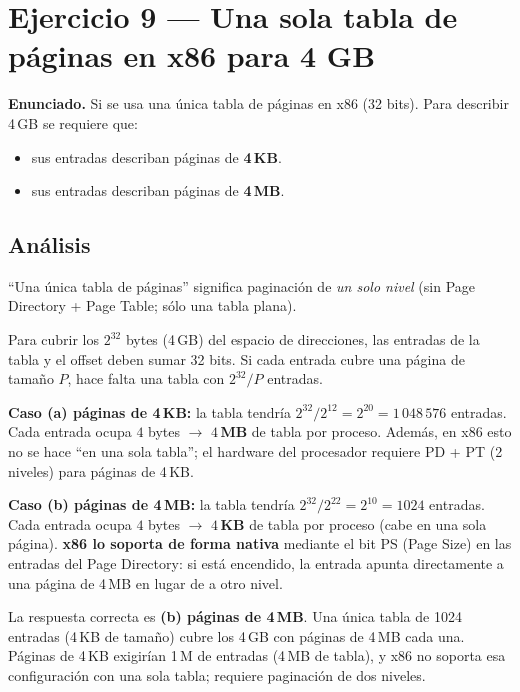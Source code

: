 \documentclass[11pt,a4paper]{article}
\begin{document}
\section{Ejercicio 9 --- Una sola tabla de páginas en x86 para 4 GB}

\textbf{Enunciado.} Si se usa una única tabla de páginas en x86
(32 bits). Para describir 4\,GB se requiere que:

\begin{itemize}[leftmargin=*,nosep]
    \item[(a)] sus entradas describan páginas de \textbf{4\,KB}.
    \item[(b)] sus entradas describan páginas de \textbf{4\,MB}.
\end{itemize}

\subsection*{Análisis}

``Una única tabla de páginas'' significa paginación de \emph{un solo
nivel} (sin Page Directory + Page Table; sólo una tabla plana).

Para cubrir los $2^{32}$ bytes (4\,GB) del espacio de direcciones,
las entradas de la tabla y el offset deben sumar 32 bits. Si cada
entrada cubre una página de tamaño $P$, hace falta una tabla con
$2^{32} / P$ entradas.

\textbf{Caso (a) páginas de 4\,KB:} la tabla tendría
$2^{32} / 2^{12} = 2^{20} = 1\,048\,576$ entradas. Cada entrada
ocupa $4$ bytes $\to$ \textbf{$4$\,MB} de tabla por proceso. Además,
en x86 esto no se hace ``en una sola tabla''; el hardware del
procesador requiere PD + PT (2 niveles) para páginas de 4\,KB.

\textbf{Caso (b) páginas de 4\,MB:} la tabla tendría
$2^{32} / 2^{22} = 2^{10} = 1024$ entradas. Cada entrada ocupa
$4$ bytes $\to$ \textbf{$4$\,KB} de tabla por proceso (cabe en una
sola página). \textbf{x86 lo soporta de forma nativa} mediante el
bit PS (Page Size) en las entradas del Page Directory: si está
encendido, la entrada apunta directamente a una página de 4\,MB en
lugar de a otro nivel.

\begin{respuesta}
La respuesta correcta es \textbf{(b) páginas de 4\,MB}. Una única
tabla de 1024 entradas (4\,KB de tamaño) cubre los 4\,GB con
páginas de 4\,MB cada una. Páginas de 4\,KB exigirían 1\,M de
entradas (4\,MB de tabla), y x86 no soporta esa configuración con
una sola tabla; requiere paginación de dos niveles.
\end{respuesta}
\end{document}
